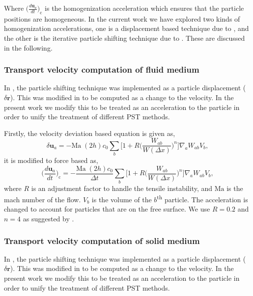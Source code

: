 \documentclass[preprint,12pt]{elsarticle}
\newcommand{\ten}[1]{\ensuremath{\mathbf{#1}}}
\begin{document}
Where $\big(\frac{d \ten{u}_a}{dt}\big)_{\text{c}}$ is the homogenization
acceleration which ensures that the particle positions are homogeneous. In the
current work we have explored two kinds of homogenization accelerations, one
is a displacement based technique due to \citet{sun2017deltaplus}, and the
other is the iterative particle shifting technique due to
\citet{huang_kernel_2019}. These are discussed in the following.


\subsubsection{Transport velocity computation of fluid medium}
\label{sec:fluid_pst}

In \citet{sun2017deltaplus}, the particle shifting technique was implemented as
a particle displacement ($\delta \ten{r}$). This was modified in
\citet{sun_consistent_2019} to be computed as a change to the velocity. In the
present work we modify this to be treated as an acceleration to the particle
in order to unify the treatment of different PST methods.

Firstly, the velocity deviation based equation is given as,
\begin{equation}
  \label{eq:sun2019_pst}
  \delta \ten{u}_a = - \text{Ma} \; (2h) c_0 \sum_b \bigg[
  1 + R \bigg( \frac{W_{ab}}{W(\Delta x)} \bigg)^n  \bigg] \nabla_a W_{ab} V_b,
\end{equation}
%
it is modified to force based as,
\begin{equation}
  \label{eq:sun2019_pst}
  \bigg(\frac{d \ten{u}_a}{dt}\bigg)_{\text{c}} = - \frac{\text{Ma} \;
    (2h) c_0}{\Delta t} \sum_b \bigg[1 + R \bigg( \frac{W_{ab}}{W(\Delta x)} \bigg)^n
  \bigg] \nabla_a W_{ab} V_b,
\end{equation}
where $R$ is an adjustment factor to handle the tensile instability, and
$\text{Ma}$ is the mach number of the flow. $V_b$ is the volume of the
$b$\textsuperscript{th} particle. The acceleration is changed to account for
particles that are on the free surface. We use $R = 0.2$ and $n = 4$ as
suggested by \citet{sun_consistent_2019}.


\subsubsection{Transport velocity computation of solid medium}
\label{sec:elastic_solid_pst}

In \citet{sun2017deltaplus}, the particle shifting technique was implemented as
a particle displacement ($\delta \ten{r}$). This was modified in
\citet{sun_consistent_2019} to be computed as a change to the velocity. In the
present work we modify this to be treated as an acceleration to the particle
in order to unify the treatment of different PST methods.
\end{document}
